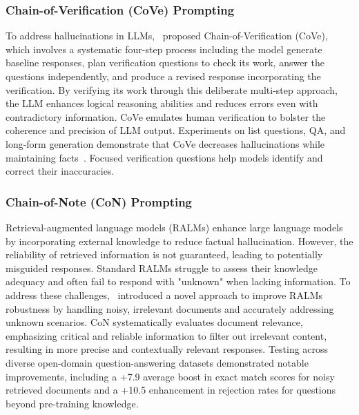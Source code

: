 \documentclass{article}
\begin{document}
\subsubsection{Chain-of-Verification (CoVe) Prompting}
\label{cove}
To address hallucinations in LLMs,~\cite{dhuliawala2023chain} proposed Chain-of-Verification (CoVe), which involves a systematic four-step process including the model generate baseline responses, plan verification questions to check its work, answer the questions independently, and produce a revised response incorporating the verification. By verifying its work through this deliberate multi-step approach, the LLM enhances logical reasoning abilities and reduces errors even with contradictory information. CoVe emulates human verification to bolster the coherence and precision of LLM output. Experiments on list questions, QA, and long-form generation demonstrate that CoVe decreases hallucinations while maintaining facts~\citep{sahoo2024comprehensive}. Focused verification questions help models identify and correct their inaccuracies.

\subsubsection{Chain-of-Note (CoN) Prompting}
\label{con}
Retrieval-augmented language models (RALMs) enhance large language models by incorporating external knowledge to reduce factual hallucination. However, the reliability of retrieved information is not guaranteed, leading to potentially misguided responses. Standard RALMs struggle to assess their knowledge adequacy and often fail to respond with "unknown" when lacking information. To address these challenges,~\cite{yu2023chainofnote} introduced a novel approach to improve RALMs robustness by handling noisy, irrelevant documents and accurately addressing unknown scenarios. CoN systematically evaluates document relevance, emphasizing critical and reliable information to filter out irrelevant content, resulting in more precise and contextually relevant responses. Testing across diverse open-domain question-answering datasets demonstrated notable improvements, including a +7.9 average boost in exact match scores for noisy retrieved documents and a +10.5 enhancement in rejection rates for questions beyond pre-training knowledge.
\end{document}
